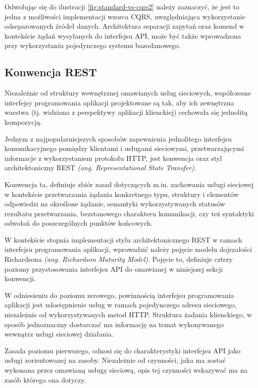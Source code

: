 Odwołując się do ilustracji \ref{fig:standard-vs-cqrs2} należy zaznaczyć, że jest to jedna z możliwości implementacji wzorca CQRS, uwzględniająca wykorzystanie odseparowanych źródeł danych. Architektura separacji zapytań oraz komend w kontekście żądań wysyłanych do interfejsu API, może być także wprowadzona przy wykorzystaniu pojedynczego systemu bazodanowego.

\subsection*{Konwencja REST}
Niezależnie od struktury wewnętrznej omawianych usług sieciowych, współczesne interfejsy programowania aplikacji projektowane są tak, aby ich zewnętrzna warstwa (tj. widziana z perspektywy aplikacji klienckiej) cechowała się jednolitą kompozycją.

Jednym z najpopularniejszych sposobów zapewnienia jednolitego interfejsu komunikacyjnego pomiędzy klientami i usługami sieciowymi, przetwarzającymi informacje z wykorzystaniem protokołu HTTP, jest konwencja oraz styl architektoniczny REST \textit{(ang. Representational State Transfer)}.

Konwencja ta, definiuje zbiór zasad dotyczących m.in. zachowania usługi sieciowej w kontekście przetwarzania żądania konkretnego typu, struktury i elementów odpowiedzi na określone żądanie, semantyki wykorzystywanych statusów rezultatu przetwarzania, bezstanowego charakteru komunikacji, czy też syntaktyki odwołań do poszczególnych punktów końcowych.

W kontekście stopnia implementacji stylu architektonicznego REST w ramach interfejsu programowania aplikacji, wprowadzić należy pojęcie modelu dojrzałości Richardsona \textit{(ang. Richardson Maturity Model)}. Pojęcie to, definiuje cztery poziomy przystosowania interfejsu API do omawianej w niniejszej sekcji konwencji.

W odniesieniu do poziomu zerowego, powinnością interfejsu programowania aplikacji jest udostępnienie usług w ramach pojedynczego adresu sieciowego, niezależnie od wykorzystywanych metod HTTP. Struktura żadania klienckiego, w sposób jednoznaczny dostarczać ma informację na temat wykonywanego wewnątrz usługi sieciowej działania.

Zasada poziomu pierwszego, odnosi się do charakterystyki interfejsu API jako usługi zorientowanej na zasoby. Niezależnie od czynności, jaka ma zostać wykonana przez omawianą usługę sieciową, opis tej czynności wskazywać ma na zasób którego ona dotyczy.

